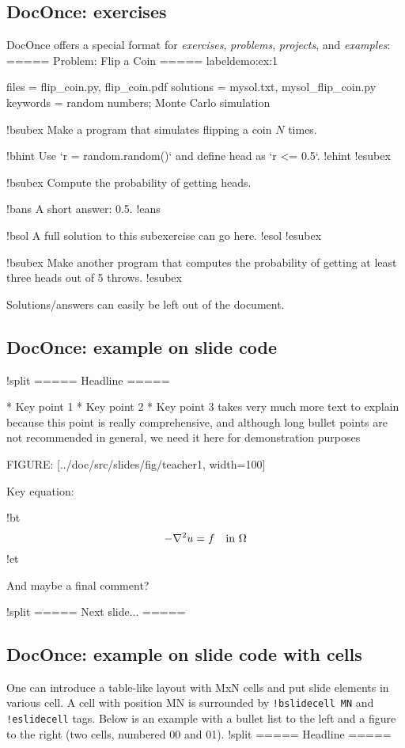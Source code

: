 \documentclass[%
oneside,                 %
final,                   %
10pt]{article}
\begin{document}
\subsection{DocOnce: exercises}
DocOnce offers a special format for \emph{exercises}, \emph{problems}, \emph{projects},
and \emph{examples}:
\bccq
===== Problem: Flip a Coin =====
label{demo:ex:1}

files = flip_coin.py, flip_coin.pdf
solutions = mysol.txt, mysol_flip_coin.py
keywords = random numbers; Monte Carlo simulation

!bsubex
Make a program that simulates flipping a coin $N$ times.

!bhint
Use `r = random.random()` and define head as `r <= 0.5`.
!ehint
!esubex

!bsubex
Compute the probability of getting heads.

!bans
A short answer: 0.5.
!eans

!bsol
A full solution to this subexercise can go here.
!esol
!esubex

!bsubex
Make another program that computes the probability
of getting at least three heads out of 5 throws.
!esubex

\eccq

Solutions/answers can easily be left out of the document.
\subsection{DocOnce: example on slide code}
\bccq
!split
===== Headline =====

 * Key point 1
 * Key point 2
 * Key point 3 takes very much more text to explain because
   this point is really comprehensive, and although long
   bullet points are not recommended in general, we need
   it here for demonstration purposes

FIGURE: [../doc/src/slides/fig/teacher1, width=100]

Key equation:

!bt
\[ -\nabla^2 u = f \quad\hbox{in }\Omega \]
!et

And maybe a final comment?

!split
===== Next slide... =====

\eccq

\subsection{DocOnce: example on slide code with cells}
One can introduce a table-like layout with MxN cells and
put slide elements in various cell. A cell with position
MN is surrounded by \Verb?!bslidecell MN? and \Verb?!eslidecell?
tags. Below is an example with a bullet list to the left and
a figure to the right (two cells, numbered 00 and 01).
\bccq
!split
===== Headline =====
\end{document}
